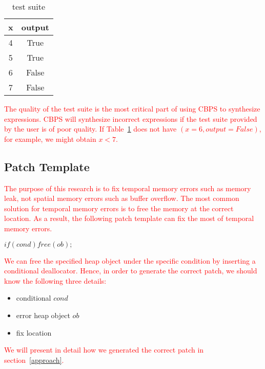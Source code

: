 \documentclass[a4j,dvipdfmx]{article}
\begin{document}
\begin{table}[h]
  \caption{test suite}
  \label{test}
  \centering
  \begin{tabular}{|c|c|}
    \hline
     x & output \\
    \hline
     4 & True \\
     5 & True \\
     6 & False \\
     7 & False \\
    \hline
  \end{tabular}
\end{table}

\textcolor{red}{
The quality of the test suite is the most critical part of using CBPS to synthesize expressions. CBPS will synthesize incorrect expressions if the test suite provided by the user is of poor quality. If Table~\ref{test} does not have $(x=6, output=False)$, for example, we might obtain $x<7$.
}

\subsection{Patch Template}
\textcolor{red}{
The purpose of this research is to fix temporal memory errors such as memory leak, not spatial memory errors such as buffer overflow. The most common solution for temporal memory errors is to free the memory at the correct location. As a result, the following patch template can fix the most of temporal memory errors.
}

\begin{minipage}{\textwidth}
    \vspace{0.2cm}
    \textsl{\hspace{0.3cm}$if ( cond ) free ( ob );$\\}
\end{minipage}
\textcolor{red}{
We can free the specified heap object under the specific condition by inserting a conditional deallocator. Hence, in order to generate the correct patch, we should know the following three details:}
\begin{itemize}
  \item[(1)] conditional $cond$
  \item[(2)] error heap object $ob$
  \item[(3)] fix location
\end{itemize}
\textcolor{red}{
We will present in detail how we generated the correct patch in section~\ref{approach}.
 }
\end{document}
